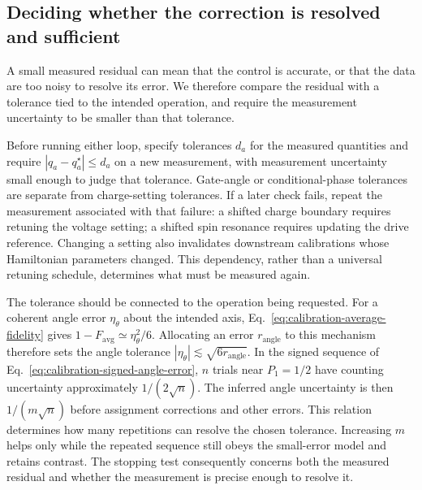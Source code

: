 \subsection{Deciding whether the correction is resolved and sufficient}

A small measured residual can mean that the control is accurate,
or that the data are too noisy to resolve its error. We therefore
compare the residual with a tolerance tied to the intended operation,
and require the measurement uncertainty to be smaller than that
tolerance.

Before running either loop, specify tolerances $d_a$ for the
measured quantities and require
$|q_a-q_a^\star|\le d_a$ on a new measurement, with measurement
uncertainty small enough to judge that tolerance. Gate-angle or
conditional-phase tolerances are separate from charge-setting
tolerances. If a later check fails, repeat the measurement associated
with that failure: a shifted charge boundary requires retuning the
voltage setting; a shifted spin resonance requires updating the
drive reference. Changing a setting also invalidates downstream
calibrations whose Hamiltonian parameters changed. This dependency,
rather than a universal retuning schedule, determines what must be
measured again.

The tolerance should be connected to the operation being requested.
For a coherent angle error $\eta_\theta$ about the intended axis,
Eq.~\eqref{eq:calibration-average-fidelity} gives
$1-F_{\mathrm{avg}}\simeq\eta_\theta^2/6$. Allocating an error
$r_{\mathrm{angle}}$ to this mechanism therefore sets the
angle tolerance
$|\eta_\theta|\lesssim\sqrt{6r_{\mathrm{angle}}}$.
In the signed sequence of
Eq.~\eqref{eq:calibration-signed-angle-error}, $n$ trials near
$P_1=1/2$ have counting uncertainty approximately
$1/(2\sqrt n)$. The inferred angle uncertainty is then
$1/(m\sqrt n)$ before assignment corrections and other errors.
This relation determines how many repetitions can resolve the
chosen tolerance. Increasing $m$ helps only while the repeated
sequence still obeys the small-error model and retains contrast.
The stopping test consequently concerns both the measured residual
and whether the measurement is precise enough to resolve it.
